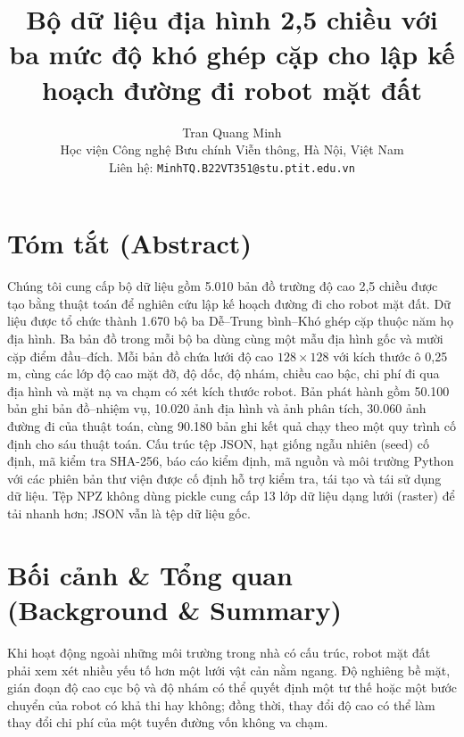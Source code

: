 \documentclass[11pt]{article}
\title{Bộ dữ liệu địa hình 2,5 chiều với ba mức độ khó ghép cặp cho lập kế hoạch đường đi robot mặt đất}
\author{%
  Tran Quang Minh\\
  \small Học viện Công nghệ Bưu chính Viễn thông, Hà Nội, Việt Nam\\
  \small Liên hệ: \texttt{MinhTQ.B22VT351@stu.ptit.edu.vn}
}
\date{}
\begin{document}
\maketitle

\section*{Tóm tắt (Abstract)}

Chúng tôi cung cấp bộ dữ liệu gồm 5.010 bản đồ trường độ cao 2,5 chiều được tạo
bằng thuật toán để nghiên cứu lập kế hoạch đường đi cho robot mặt đất. Dữ liệu được tổ
chức thành 1.670 bộ ba Dễ--Trung bình--Khó ghép cặp thuộc năm họ địa hình. Ba
bản đồ trong mỗi bộ ba dùng cùng một mẫu địa hình gốc và mười cặp điểm đầu--đích. Mỗi bản đồ chứa
lưới độ cao $128\times128$ với kích thước ô 0,25 m, cùng các lớp độ cao mặt đỡ,
độ dốc, độ nhám, chiều cao bậc, chi phí đi qua địa hình và mặt nạ va chạm có xét
kích thước robot. Bản phát hành gồm 50.100 bản ghi bản đồ--nhiệm vụ, 10.020 ảnh
địa hình và ảnh phân tích, 30.060 ảnh đường đi của thuật toán, cùng 90.180 bản
ghi kết quả chạy theo một quy trình cố định cho sáu thuật toán. Cấu trúc tệp
JSON, hạt giống ngẫu nhiên (seed) cố định, mã kiểm tra SHA-256, báo cáo kiểm
định, mã nguồn và môi trường Python với các phiên bản thư viện được cố định hỗ trợ
kiểm tra, tái tạo và tái sử dụng dữ liệu. Tệp NPZ không dùng pickle cung cấp
13 lớp dữ liệu dạng lưới (raster) để tải nhanh hơn; JSON vẫn là tệp dữ liệu gốc.

\section{Bối cảnh \& Tổng quan (Background \& Summary)}

Khi hoạt động ngoài những môi trường trong nhà có cấu trúc, robot mặt đất phải
xem xét nhiều yếu tố hơn một lưới vật cản nằm ngang. Độ nghiêng bề mặt, gián đoạn độ cao
cục bộ và độ nhám có thể quyết định một tư thế hoặc một bước chuyển của robot
có khả thi hay không; đồng thời, thay đổi độ cao có thể làm thay đổi chi phí của
một tuyến đường vốn không va chạm.
\end{document}
